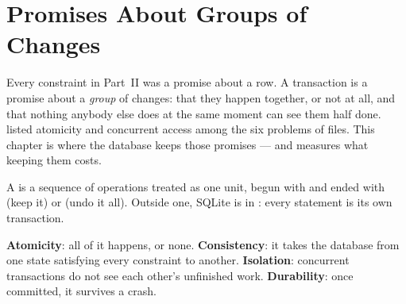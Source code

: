 \section{Promises About Groups of Changes}

Every constraint in Part~II was a promise about a row. A transaction is a
promise about a \emph{group} of changes: that they happen together, or not at
all, and that nothing anybody else does at the same moment can see them half
done.  listed atomicity and concurrent access among the six
problems of files. This chapter is where the database keeps those promises ---
and measures what keeping them costs.

\begin{definitionbox}
A  is a sequence of operations treated as one unit, begun
with  and ended with  (keep it) or 
(undo it all). Outside one, SQLite is in : every statement is
its own transaction.

\smallskip
\textbf{Atomicity}: all of it happens, or none. \textbf{Consistency}: it takes
the database from one state satisfying every constraint to another.
\textbf{Isolation}: concurrent transactions do not see each other's
unfinished work. \textbf{Durability}: once committed, it survives a crash.
\end{definitionbox}

